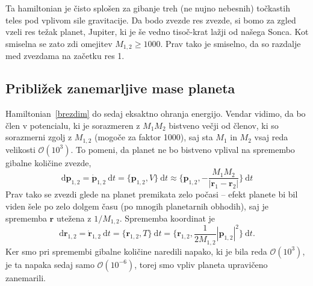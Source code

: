 \documentclass[12pt, a4paper]{article}
\renewcommand{\r}{
    \ensuremath{\mathbf{r}}
}
\newcommand{\p}{
    \ensuremath{\mathbf{p}}
}
\newcommand{\sfrac}[2]{
    \ensuremath{\textstyle{\frac{#1}{#2}}}
}
\renewcommand{\d}{
    \ensuremath{\mathrm{d}}
}
\begin{document}
Ta hamiltonian je \v cisto splo\v sen za gibanje treh (ne nujno nebesnih) to\v ckastih teles pod vplivom sile
gravitacije. Da bodo zvezde res zvezde, si bomo za zgled vzeli res te\v zak planet, Jupiter, ki je \v se
vedno tiso\v c-krat la\v zji od na\v sega Sonca. Kot smiselna se zato zdi omejitev $M_{1,2} \geq 1000$.
Prav tako je smiselno, da so razdalje med zvezdama na za\v cetku res 1.

\subsection{Pribli\v zek zanemarljive mase planeta}

Hamiltonian~\eqref{brezdim} do sedaj eksaktno ohranja energijo. Vendar vidimo, da bo \v clen v potencialu, ki je
sorazmeren z $M_1 M_2$ bistveno ve\v cji od \v clenov, ki so sorazmerni zgolj z $M_{1,2}$ (mogo\v ce za faktor 1000),
saj sta $M_1$ in $M_2$ vsaj reda velikosti $\mathcal{O}(10^3)$. To pomeni, da planet ne bo bistveno vplival na
spremembo gibalne koli\v cine zvezde,
\begin{equation}
    \d\p_{1,2} = \dot{\p}_{1,2}\ \d t = \{\p_{1,2}, V\}\ \d t \approx
        \Big\{\p_{1,2}, -\sfrac{M_1M_2}{|\r_1 - \r_2|}\Big\}\ \d t
\end{equation}
Prav tako se zvezdi glede na planet premikata zelo po\v casi -- efekt planete bi bil viden \v sele po zelo dolgem
\v casu (po mnogih planetarnih obhodih), saj je sprememba $\r$ ute\v zena z $1/M_{1,2}$. Sprememba koordinat
je
\begin{equation}
    \d \r_{1,2} = \dot{\r}_{1,2}\ \d t = \{\r_{1,2}, T\}\ \d t = \big\{\r_{1,2}, \sfrac{1}{2M_{1,2}}|\p_{1,2}|^2\big\}\ \d t.
\end{equation}
Ker smo pri spremembi gibalne koli\v cine naredili napako, ki je bila reda $\mathcal{O}(10^3)$, je ta napaka sedaj
samo $\mathcal{O}(10^{-6})$, torej smo vpliv planeta upravi\v ceno zanemarili.
\end{document}
